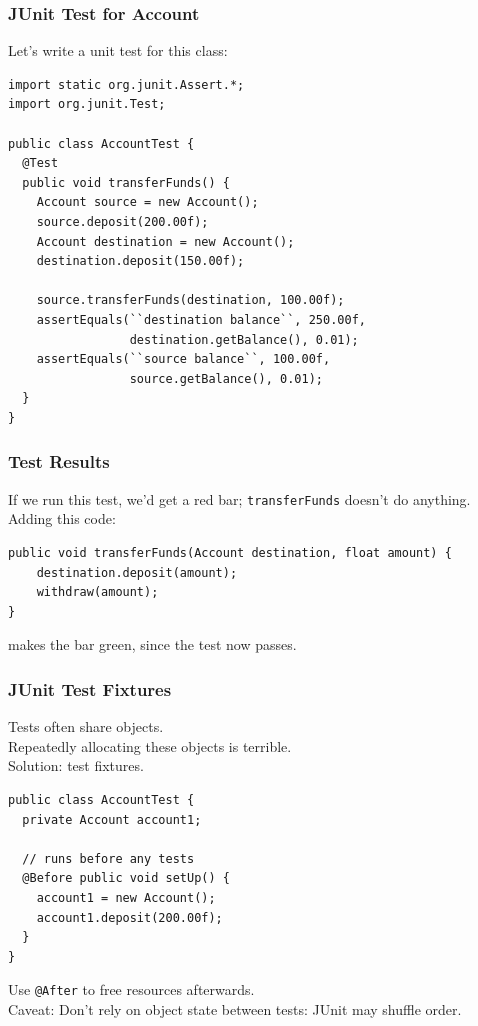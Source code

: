 \begin{frame}[fragile]
\frametitle{JUnit Test for Account}
\begin{changemargin}{1cm}
Let's write a unit test for this class:

{\scriptsize
\begin{verbatim}
import static org.junit.Assert.*;
import org.junit.Test;

public class AccountTest {
  @Test
  public void transferFunds() {
    Account source = new Account();
    source.deposit(200.00f);
    Account destination = new Account();
    destination.deposit(150.00f);

    source.transferFunds(destination, 100.00f);
    assertEquals(``destination balance``, 250.00f, 
                 destination.getBalance(), 0.01);
    assertEquals(``source balance``, 100.00f, 
                 source.getBalance(), 0.01);
  }
}
\end{verbatim}
}
\end{changemargin}
\end{frame}

\begin{frame}[fragile]
\frametitle{Test Results}

\begin{changemargin}{1cm}
If we run this test, we'd get a red bar; {\tt transferFunds} doesn't
do anything. Adding this code:

{\scriptsize
\begin{verbatim}
public void transferFunds(Account destination, float amount) {
    destination.deposit(amount);
    withdraw(amount);
}
\end{verbatim}
}
makes the bar green, since the test now passes.
\end{changemargin}
\end{frame}

\begin{frame}[fragile]
\frametitle{JUnit Test Fixtures}

\begin{changemargin}{1cm}
Tests often share objects.\\[1em]

Repeatedly allocating these objects is terrible.\\[1em]

Solution: test fixtures.

\begin{verbatim}
public class AccountTest {
  private Account account1;

  // runs before any tests
  @Before public void setUp() {
    account1 = new Account(); 
    account1.deposit(200.00f);
  }
}
\end{verbatim}

Use {\tt @After} to free resources afterwards.\\[1em]

\alert{Caveat:} Don't rely on object state between tests: JUnit may shuffle order.
\end{changemargin}
\end{frame}

